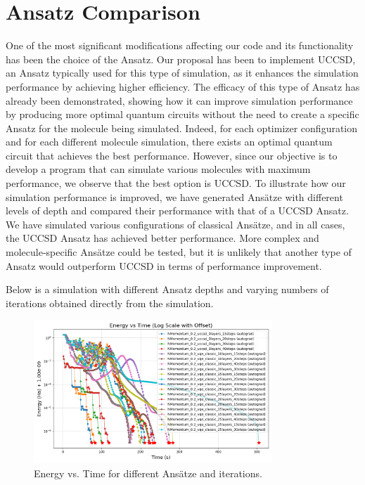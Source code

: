 \section{Ansatz Comparison}
One of the most significant modifications affecting our code and its functionality has been the choice of the Ansatz. Our proposal has been to implement UCCSD, an Ansatz typically used for this type of simulation, as it enhances the simulation performance by achieving higher efficiency. The efficacy of this type of Ansatz has already been demonstrated, showing how it can improve simulation performance by producing more optimal quantum circuits without the need to create a specific Ansatz for the molecule being simulated. Indeed, for each optimizer configuration and for each different molecule simulation, there exists an optimal quantum circuit that achieves the best performance. However, since our objective is to develop a program that can simulate various molecules with maximum performance, we observe that the best option is UCCSD. To illustrate how our simulation performance is improved, we have generated Ansätze with different levels of depth and compared their performance with that of a UCCSD Ansatz. We have simulated various configurations of classical Ansätze, and in all cases, the UCCSD Ansatz has achieved better performance. More complex and molecule-specific Ansätze could be tested, but it is unlikely that another type of Ansatz would outperform UCCSD in terms of performance improvement.

Below is a simulation with different Ansatz depths and varying numbers of iterations obtained directly from the simulation.

\begin{figure}[H]
  \centering
  \includegraphics[width=0.8\textwidth]{data/Anzatz/results_ansatz_lyers_dif_iterations/energy_vs_time_log_offset.png}
  \caption{Energy vs. Time for different Ansätze and iterations.}
  \label{fig:ansatz_layers_iterations}
\end{figure}

